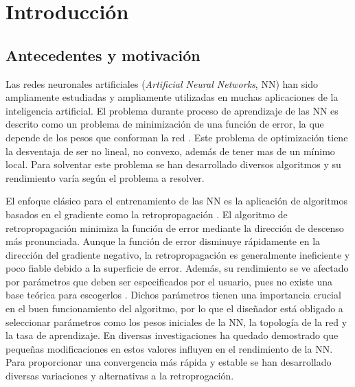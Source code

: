 \chapter{Introducción}
\section{Antecedentes y motivación}
Las redes neuronales artificiales ({\em Artificial Neural Networks}, NN) han sido ampliamente estudiadas y ampliamente utilizadas en muchas aplicaciones de la inteligencia artificial. El problema durante proceso de aprendizaje de las NN es descrito como un problema de minimización de una función de error, la que depende de los pesos que conforman la red \cite{Rumelhart1986}. Este problema de optimización tiene la desventaja de ser no lineal, no convexo, además de tener mas de un mínimo local. Para solventar este problema se han desarrollado diversos algoritmos \cite{Grippo1994,Jacobs1988,Plagianakos2002,Rumelhart1986b,Plagianakos1998}  y su rendimiento varía según el problema a resolver.

El enfoque clásico para el entrenamiento de las NN es la aplicación de algoritmos basados en el gradiente como la retropropagación \cite{Rumelhart1986b}. El algoritmo de retropropagación minimiza la función de error mediante la dirección de descenso más pronunciada. Aunque la función de error disminuye rápidamente en la dirección del gradiente negativo, la retropropagación es generalmente ineficiente y poco fiable \cite{Gori1992} debido a la superficie de error. Además, su rendimiento se ve afectado por parámetros que deben ser especificados por el usuario, pues no existe una base teórica para escogerlos \cite{Nguyen1990}. Dichos parámetros tienen una importancia crucial en el buen funcionamiento del algoritmo, por lo que el diseñador está obligado a seleccionar parámetros como los pesos iniciales de la NN, la topología de la red y la tasa de aprendizaje. En diversas investigaciones \cite{Cauchy1847,Grippo1994,Plagianakos1998,Plagianakos2002} ha quedado demostrado que pequeñas modificaciones en estos valores influyen en el rendimiento de la NN. Para proporcionar una convergencia más rápida y estable se han desarrollado diversas variaciones y alternativas a la retroprogación.

